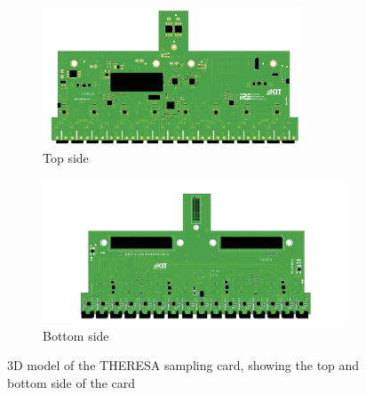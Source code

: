 \begin{figure}[tb]
	\centering
	\begin{subfigure}{\textwidth}
		\centering
		\includegraphics[width=0.85\textwidth]{chap/04-theresa/img/pcb/front_2}  
		\caption{Top side}
		\label{fig:pcb_front}
	\end{subfigure}
	\begin{subfigure}{\textwidth}
		\centering
		\includegraphics[width=\textwidth]{chap/04-theresa/img/pcb/back}  
		\caption{Bottom side}
		\label{fig:pcb_back}
	\end{subfigure}
	\caption[THERESA sampling card]{3D model of the THERESA sampling card, showing the top and bottom side of the card}
	\label{fig:sampling_card}
\end{figure}
